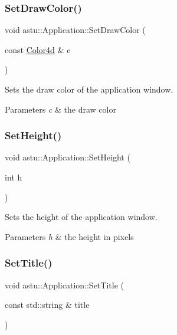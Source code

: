 \subsubsection{\texorpdfstring{Set\+Draw\+Color()}{SetDrawColor()}}
{\footnotesize\ttfamily void astu\+::\+Application\+::\+Set\+Draw\+Color (\begin{DoxyParamCaption}\item[{const \hyperlink{classastu_1_1Color}{Color4d} \&}]{c }\end{DoxyParamCaption})}

Sets the draw color of the application window.


\begin{DoxyParams}{Parameters}
{\em c} & the draw color \\
\hline
\end{DoxyParams}
\mbox{\label{classastu_1_1Application_a192e4c7ccec81846119762f30aceaf12}} 
\subsubsection{\texorpdfstring{Set\+Height()}{SetHeight()}}
{\footnotesize\ttfamily void astu\+::\+Application\+::\+Set\+Height (\begin{DoxyParamCaption}\item[{int}]{h }\end{DoxyParamCaption})}

Sets the height of the application window.


\begin{DoxyParams}{Parameters}
{\em h} & the height in pixels \\
\hline
\end{DoxyParams}
\mbox{\label{classastu_1_1Application_aa5336d4fa0fff6231b4260888cb04440}} 
\subsubsection{\texorpdfstring{Set\+Title()}{SetTitle()}}
{\footnotesize\ttfamily void astu\+::\+Application\+::\+Set\+Title (\begin{DoxyParamCaption}\item[{const std\+::string \&}]{title }\end{DoxyParamCaption})}

